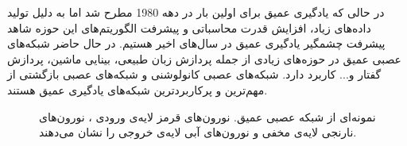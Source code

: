	  در حالی که یادگیری عمیق برای اولین بار در دهه 1980 مطرح شد اما به دلیل تولید داده‌های زیاد، افزایش  قدرت محاسباتی و پیشرفت الگوریتم‌های این حوزه شاهد پیشرفت چشمگیر یادگیری عمیق در سال‌های اخیر هستیم. در حال حاضر شبکه‌های عصبی عمیق در حوزه‌های زیادی از جمله پردازش زبان طبیعی، بینایی ماشین، پردازش گفتار و... کاربرد دارد. شبکه‌های عصبی کانولوشنی و شبکه‌های عصبی بازگشتی از مهم‌ترین و پرکاربردترین شبکه‌های یادگیری عمیق هستند.
	\begin{figure}
	  	\caption[نمونه‌ای از شبکه عصبی عمیق]{نمونه‌ای از شبکه عصبی عمیق. نورون‌های قرمز لایه‌ی ورودی ، نورون‌های نارنجی لایه‌ی مخفی و نورون‌های آبی لایه‌ی خروجی را نشان ‌می‌دهند.}
	  	\label{fig:DNN}
	\end{figure}

